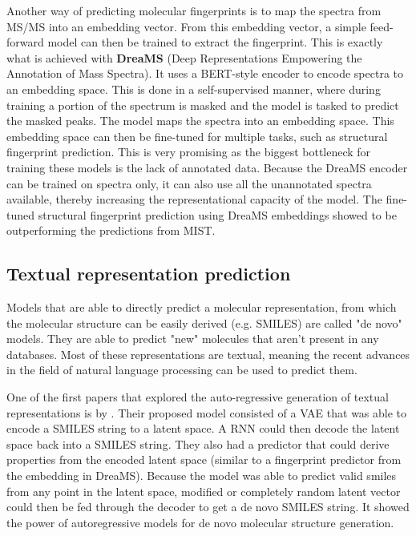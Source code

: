 Another way of predicting molecular fingerprints is to map the spectra from \ac{MS/MS} into an embedding vector.
From this embedding vector, a simple feed-forward model can then be trained to extract the fingerprint.
This is exactly what is achieved with \textbf{DreaMS} \cite{bushuiev2024emergence} (Deep Representations Empowering the Annotation of Mass Spectra).
It uses a BERT-style encoder \cite{devlin2018bert} to encode spectra to an embedding space.
This is done in a self-supervised manner, where during training a portion of the spectrum is masked and the model is tasked to predict the masked peaks.
The model maps the spectra into an embedding space.
This embedding space can then be fine-tuned for multiple tasks, such as structural fingerprint prediction.
This is very promising as the biggest bottleneck for training these models is the lack of annotated data.
Because the DreaMS encoder can be trained on spectra only, it can also use all the unannotated spectra available, thereby increasing the representational capacity of the model. The fine-tuned structural fingerprint prediction using DreaMS embeddings showed to be outperforming the predictions from MIST.

\subsection{Textual representation prediction}

Models that are able to directly predict a molecular representation, from which the molecular structure can be easily derived (e.g. SMILES) are called "de novo" models. They are able to predict "new" molecules that aren't present in any databases. Most of these representations are textual, meaning the recent advances in the field of natural language processing can be used to predict them.

One of the first papers that explored the auto-regressive generation of textual representations is by \textcite{gomez2018automatic}.
Their proposed model consisted of a \ac{VAE} that was able to encode a SMILES string to a latent space.
A \ac{RNN} could then decode the latent space back into a SMILES string.
They also had a predictor that could derive properties from the encoded latent space (similar to a fingerprint predictor from the embedding in DreaMS).
Because the model was able to predict valid smiles from any point in the latent space, modified or completely random latent vector could then be fed through the decoder to get a de novo SMILES string. It showed the power of autoregressive models for de novo molecular structure generation.

